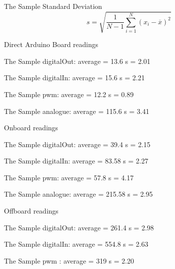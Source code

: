 The Sample Standard Deviation $$s = \sqrt{\frac{1}{N-1} \sum_{i=1}^N (x_i - \overline{x})^2}$$

Direct Arduino Board readings

The Sample digitalOut: %
average = 13.6
s = 2.01

The Sample digitalIn: %
average = 15.6
s = 2.21

The Sample pwm: %
average = 12.2
s = 0.89

The Sample analogue:%
average = 115.6
s = 3.41

Onboard readings

The Sample digitalOut:%
average = 39.4
s = 2.15

The Sample digitalIn:%
average = 83.58
s = 2.27

The Sample pwm:%
average = 57.8
s = 4.17

The Sample analogue:%
average = 215.58
s = 2.95

Offboard readings

The Sample digitalOut:%
average = 261.4
s = 2.98

The Sample digitalIn:%
average = 554.8
s = 2.63

The Sample pwm :%
average = 319
s = 2.20

